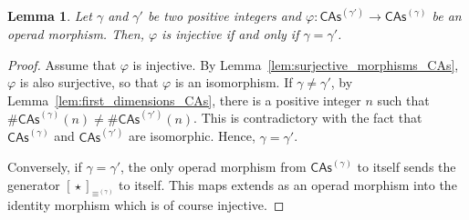 \documentclass[10pt,reqno]{amsart}
\numberwithin{equation}{subsection}
\newtheorem{Lemma}[Theorem]{Lemma}
\newcommand{\CAs}[1]{\mathsf{CAs}^{(#1)}}
\DeclareMathOperator{\Product}{\star}
\DeclareMathOperator{\Congr}{\equiv}
\newcommand{\CongrCAs}[1]{\Congr^{(#1)}}
\begin{document}
\begin{Lemma} \label{lem:injective_morphisms_CAs}
    Let $\gamma$ and $\gamma'$ be two positive integers and
    $\varphi:\CAs{\gamma'} \to \CAs{\gamma}$ be an operad morphism.
    Then, $\varphi$ is injective if and only if $\gamma = \gamma'$.
\end{Lemma}
\begin{proof}
    Assume that $\varphi$ is injective. By
    Lemma~\ref{lem:surjective_morphisms_CAs}, $\varphi$ is also
    surjective, so that $\varphi$ is an isomorphism. If
    $\gamma \ne \gamma'$, by Lemma~\ref{lem:first_dimensions_CAs}, there
    is a positive integer $n$ such that
    $\# \CAs{\gamma}(n) \ne \# \CAs{\gamma'}(n)$. This is contradictory
    with the fact that $\CAs{\gamma}$ and $\CAs{\gamma'}$ are
    isomorphic. Hence, $\gamma = \gamma'$.
    \smallbreak

    Conversely, if $\gamma = \gamma'$, the only operad morphism from
    $\CAs{\gamma}$ to itself sends the generator
    $[\Product]_{\CongrCAs{\gamma}}$ to itself. This maps extends as
    an operad morphism into the identity morphism which is of course
    injective.
\end{proof}
\medbreak
\end{document}
